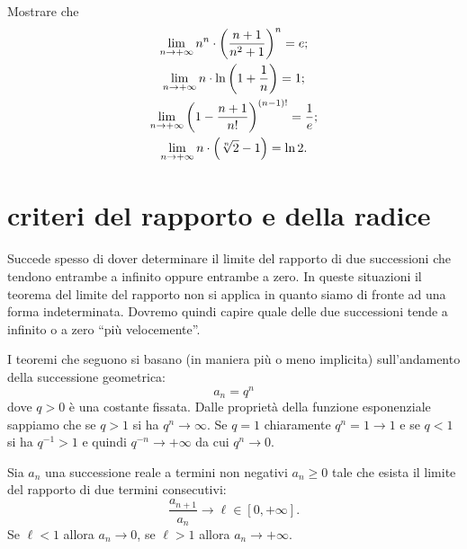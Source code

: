 \begin{exercise}
Mostrare che
\begin{gather*}
  \lim_{n\to+\infty} n^n\cdot {\left( \frac{n+1}{n^2+1} \right)}^n = e; \\
  \lim_{n\to+\infty} n\cdot \ln{\left( 1 + \frac 1 n \right)} = 1; \\
  \lim_{n\to+\infty} {\left( 1-\frac{n+1}{n!} \right)}^{(n-1)!} = \frac 1 e; \\
  \lim_{n\to+\infty} n \cdot {\left( \sqrt[n]{2}-1 \right)} = \ln 2.
\end{gather*}
\end{exercise}

\section{criteri del rapporto e della radice}

Succede spesso di dover determinare il limite
del rapporto di due successioni che tendono entrambe a infinito
oppure entrambe a zero.
In queste situazioni il teorema del limite del rapporto non
si applica in quanto siamo di fronte ad una forma indeterminata.
Dovremo quindi capire quale delle due successioni
tende a infinito o a zero ``più velocemente''.

I teoremi che seguono si basano (in maniera più o meno implicita)
sull'andamento della successione geometrica:
\[
  a_n = q^n
\]
dove $q>0$ è una costante fissata.
Dalle proprietà della funzione esponenziale 
sappiamo che se $q>1$ si ha $q^n\to \infty$.
Se $q=1$ chiaramente $q^n=1\to 1$
e se $q<1$ si ha $q^{-1}>1$ e quindi $q^{-n} \to +\infty$
da cui $q^n \to 0$.

\begin{theorem}
\label{th:criterio_rapporto}
  Sia $a_n$ una successione reale a termini non negativi
  $a_n \ge 0$ tale che esista il limite del rapporto di due termini consecutivi:
  \[
     \frac{a_{n+1}}{a_n} \to \ell \in [0,+\infty].
  \]
  Se $\ell < 1$ allora $a_n \to 0$, se $\ell >1$ allora $a_n \to +\infty$.
\end{theorem}
%
\begin{comment}
\begin{proof}\footnote{%
  la dimostrazione di questo teorema si potrebbe fare in maniera
  molto simile alla dimostrazione del teorema~\ref{th:criterio_radice}
  senza tirare in ballo il teorema~\ref{th:criterio_cesaro} che è decisamente più complesso.
  }
Grazie al teorema~\ref{th:criterio_cesaro} sappiamo
che $\sqrt[n]{a_n}\to \ell$ e quindi il risultato
segue direttametne dal teorema~\ref{th:criterio_radice}.
\end{proof}
\end{comment}

